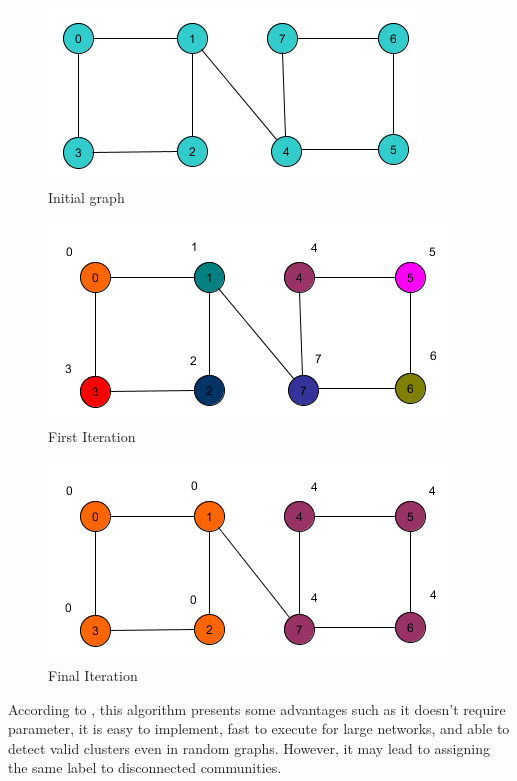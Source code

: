 	  \begin{figure}[!hb]
	  \centering
	  \includegraphics[scale=0.6]{graphics/LP0.png} 
	  \caption{Initial graph}
	  \label{lpa}
	\end{figure}
	  \begin{figure}[!hb]
	  \centering
	  \includegraphics[scale=0.6]{graphics/LP1.png} 
	  \caption{First Iteration}
	  \label{lpa}
	\end{figure}
	\begin{figure}[h]
	  \centering
	  \includegraphics[scale=0.6]{graphics/LP2.png} 
	  \caption{Final Iteration}
	  \label{lpa}
	\end{figure}
	
  According to \cite{a:comm}, this algorithm presents some advantages such as it doesn't require parameter, it is easy to implement, fast to execute for large networks, and able to detect valid clusters even in random graphs. However, it may lead to assigning the same label to disconnected communities.

